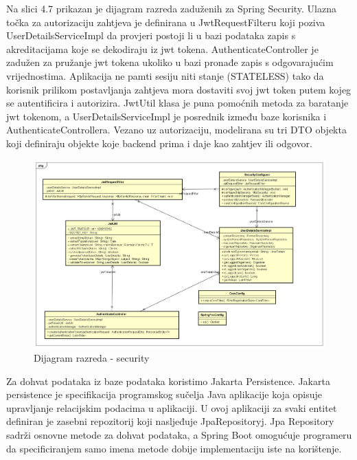 	Na slici 4.7 prikazan je dijagram razreda zaduženih za Spring Security.
	Ulazna točka za autorizaciju zahtjeva je definirana u JwtRequestFilteru koji poziva UserDetailsServiceImpl da provjeri postoji li u bazi podataka zapis s akreditacijama koje se dekodiraju iz jwt tokena.
	AuthenticateController je zadužen za pružanje jwt tokena ukoliko u bazi pronađe zapis s odgovarajućim vrijednostima.
	Aplikacija ne pamti sesiju niti stanje (STATELESS) tako da korisnik prilikom postavljanja zahtjeva mora dostaviti svoj jwt token putem kojeg se autentificira i autorizira.
	JwtUtil klasa je puna pomoćnih metoda za baratanje jwt tokenom, a UserDetailsServiceImpl je posrednik između baze korisnika i AuthenticateControllera.
	Vezano uz autorizaciju, modelirana su tri DTO objekta koji definiraju objekte koje backend prima i daje kao zahtjev ili odgovor.
	

		\begin{figure}[H]
			\begin{center}
				\includegraphics[width=17cm]{slike/security1.PNG}
			\end{center}
			\caption{Dijagram razreda - security}
			\label{fig:sec}
		\end{figure}
	
	Za dohvat podataka iz baze podataka koristimo Jakarta Persistence. Jakarta persistence je specifikacija programskog sučelja Java aplikacije koja opisuje upravljanje relacijskim podacima u aplikaciji. U ovoj aplikaciji za svaki entitet definiran je zasebni repozitorij koji nasljeđuje JpaRepositoryj. Jpa Repository sadrži osnovne metode za dohvat podataka, a Spring Boot omogućuje programeru da specificiranjem samo imena metode dobije implementaciju iste na korištenje. 
	
